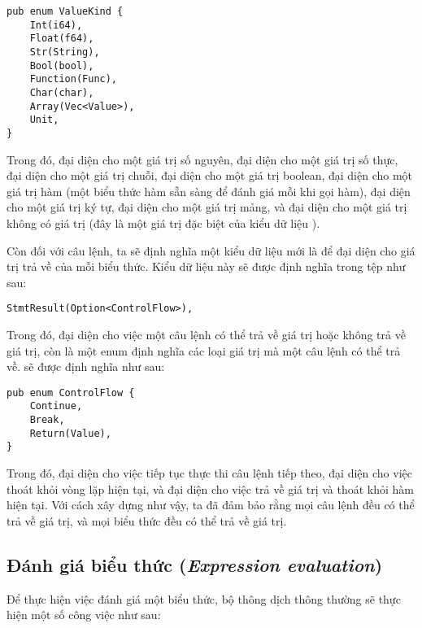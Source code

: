 \begin{lstlisting}[]
pub enum ValueKind {
    Int(i64),
    Float(f64),
    Str(String),
    Bool(bool),
    Function(Func),
    Char(char),
    Array(Vec<Value>),
    Unit,
}
\end{lstlisting}

    Trong đó,  đại diện cho một giá trị số nguyên,  đại diện cho một giá trị số thực,  đại diện cho một giá trị chuỗi,  đại diện cho một giá trị boolean,  đại diện cho một giá trị hàm (một biểu thức hàm sẵn sàng để đánh giá mỗi khi gọi hàm),  đại diện cho một giá trị ký tự,  đại diện cho một giá trị mảng, và  đại diện cho một giá trị không có giá trị (đây là một giá trị đặc biệt của kiểu dữ liệu ). 

    
    Còn đối với câu lệnh, ta sẽ định nghĩa một kiểu dữ liệu mới là  để đại diện cho giá trị trả về của mỗi biểu thức. Kiểu dữ liệu này sẽ được định nghĩa trong tệp  như sau:

\begin{lstlisting}[]
StmtResult(Option<ControlFlow>),
\end{lstlisting}

    Trong đó,  đại diện cho việc một câu lệnh có thể trả về giá trị hoặc không trả về giá trị, còn  là một enum định nghĩa các loại giá trị mà một câu lệnh có thể trả về.  sẽ được định nghĩa như sau:

\begin{lstlisting}[]
pub enum ControlFlow {
    Continue,
    Break,
    Return(Value),
}
\end{lstlisting}

    Trong đó,  đại diện cho việc tiếp tục thực thi câu lệnh tiếp theo,  đại diện cho việc thoát khỏi vòng lặp hiện tại, và  đại diện cho việc trả về giá trị  và thoát khỏi hàm hiện tại. Với cách xây dựng như vậy, ta đã đảm bảo rằng mọi câu lệnh đều có thể trả về giá trị, và mọi biểu thức đều có thể trả về giá trị.

\subsection{Đánh giá biểu thức (\textit{Expression evaluation})}

    Để thực hiện việc đánh giá một biểu thức, bộ thông dịch thông thường sẽ thực hiện một số công việc như sau:

